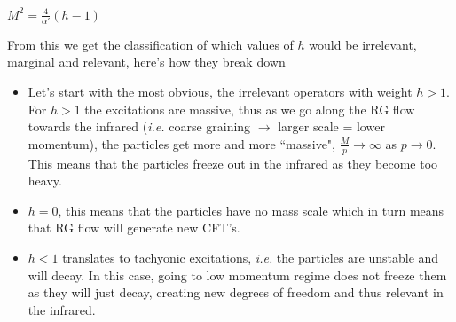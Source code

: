 \documentclass[aps,preprint,preprintnumbers,nofootinbib,showpacs,prd]{revtex4-1}
\newcommand{\ie}{{\it i.e.} }
\newcommand{\bit}{\begin{itemize}}
\newcommand{\eit}{\end{itemize}}
\begin{document}
$M^2 = \frac{4}{\alpha'} (h - 1)$

From this we get the classification of which values of $h$ would be irrelevant, marginal and relevant, here's how they break down
\bit
\item Let's start with the most obvious, the irrelevant operators with weight $h > 1$. For $h > 1$ the excitations are massive, thus as we go along the RG flow towards the infrared (\ie coarse graining $\rightarrow$ larger scale = lower momentum), the particles get more and more ``massive", $\frac{M}{p} \rightarrow \infty$ as $p \rightarrow 0$. This means that the particles freeze out in the infrared as they become too heavy.
\item $h = 0$, this means that the particles have no mass scale which in turn means that RG flow will generate new CFT's.
\item $h < 1$ translates to tachyonic excitations, \ie the particles are unstable and will decay. In this case, going to low momentum regime does not freeze them as they will just decay, creating new degrees of freedom and thus relevant in the infrared.
\eit
\end{document}
